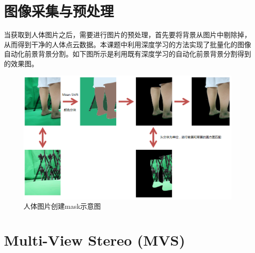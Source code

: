 \documentclass[10pt]{article}
\begin{document}
\section{图像采集与预处理}
当获取到人体图片之后，需要进行图片的预处理，首先要将背景从图片中剔除掉，从而得到干净的人体点云数据。本课题中利用深度学习的方法实现了批量化的图像自动化前景背景分割。如下图所示是利用既有深度学习的自动化前景背景分割得到的效果图。
\begin{figure}[H]
\begin{center}
\includegraphics[scale=0.3]{image_pre_processing.png}
\caption{人体图片创建mask示意图}
\end{center}
\end{figure}

\section{Multi-View Stereo (MVS)}
\end{document}
